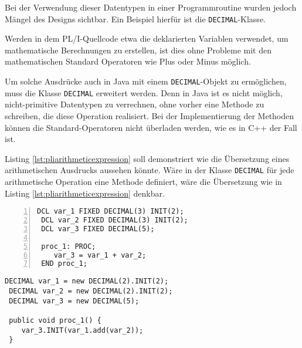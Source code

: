 
Bei der Verwendung dieser Datentypen in einer Programmroutine wurden jedoch Mängel des Designs sichtbar. Ein Beispiel hierfür ist die \verb+DECIMAL+-Klasse.

Werden in dem PL/I-Quellcode etwa die deklarierten Variablen verwendet, um mathematische Berechnungen zu erstellen, ist dies ohne Probleme mit den mathematischen Standard Operatoren wie Plus oder Minus möglich.

Um solche Ausdrücke auch in Java mit einem \verb+DECIMAL+-Objekt zu ermöglichen, muss die Klasse \verb+DECIMAL+ erweitert werden.
Denn in Java ist es nicht möglich, nicht-primitive Datentypen zu verrechnen, ohne vorher eine Methode zu schreiben, die diese Operation realisiert. 
Bei der Implementierung der Methoden können die Standard-Operatoren nicht überladen werden, wie es in C++ der Fall ist.

Listing \ref{lst:pliarithmeticexpression} soll demonstriert wie die Übersetzung eines arithmetischen Ausdrucks aussehen könnte.
Wäre in der Klasse \verb+DECIMAL+ für jede arithmetische Operation eine Methode definiert, wäre die Übersetzung wie in Listing \ref{lst:pliarithmeticexpression} denkbar.

\begin{minipage}[b]{0.48\linewidth}
	\centering
	\lstset{language=PL/I}
	\begin{lstlisting}[frame=single, numbers=left, mathescape,%
		caption={Transformation DECIMAL}, label={lst:pliarithmeticexpression}, basicstyle=\fontsize{9}{13}\selectfont\ttfamily]
 DCL var_1 FIXED DECIMAL(3) INIT(2);
 DCL var_2 FIXED DECIMAL(3) INIT(2);
 DCL var_3 FIXED DECIMAL(5);
		
 proc_1: PROC;
 	var_3 = var_1 + var_2;
 END proc_1;
	\end{lstlisting}
\end{minipage}
\hspace{0.5cm}
\begin{minipage}[b]{0.48\linewidth}
	\centering
	\lstset{language=Java}
	\begin{lstlisting}[frame=single, mathescape,%
		title={" "}, basicstyle=\fontsize{9}{13}\selectfont\ttfamily]
 DECIMAL var_1 = new DECIMAL(2).INIT(2);
 DECIMAL var_2 = new DECIMAL(2).INIT(2);
 DECIMAL var_3 = new DECIMAL(5);
		
 public void proc_1() {
 	var_3.INIT(var_1.add(var_2));
 }
	\end{lstlisting}
\end{minipage}

